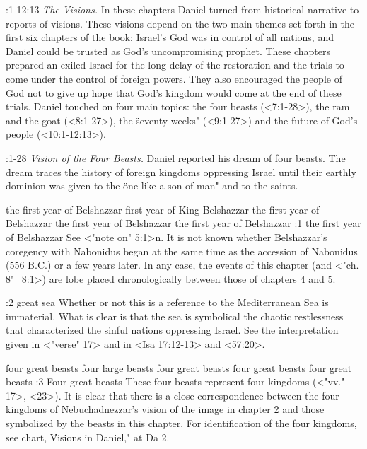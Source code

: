 :1-12:13 {} {\it The Visions.\/} In these chapters Daniel turned from
historical narrative to reports of visions. These visions depend on the two main themes set forth
in the first six chapters of the book: Israel's God was in control of all nations, and Daniel could
be trusted as God's uncompromising prophet. These chapters prepared an exiled Israel for the long
delay of the restoration and the trials to come under the control of foreign powers. They also
encouraged the people of God not to give up hope that God's kingdom would come at the end of these
trials. Daniel touched on four main topics: the four beasts (<7:1-28>), the ram and the goat (<8:1-27>),
the \"seventy weeks" (<9:1-27>) and the future of God's people (<10:1-12:13>).


:1-28 {} {\it Vision of the Four Beasts.\/} Daniel reported his dream of four beasts. The dream traces
the history of foreign kingdoms oppressing Israel until their earthly dominion was given to the \"one
like a son of man" and to the saints.

    {the first year of Belshazzar} %
    {first year of King Belshazzar} %
    {the first year of Belshazzar} %
    {the first year of Belshazzar} %
    {the first year of Belshazzar} %
:1 {the first year of Belshazzar} See <"note on" 5:1>n. It is not known whether
Belshazzar's coregency with Nabonidus began at the same time as the accession of Nabonidus (556
B.C.) or a few years later. In any case, the events of this chapter (and <"ch. 8"_8:1>) are lobe placed
chronologically between those of chapters 4 and 5.

:2 {great sea} Whether or not this is a reference
to the Mediterranean Sea is immaterial. What is clear is that the sea is symbolical the chaotic
restlessness that characterized the sinful nations oppressing Israel. See the interpretation given
in <"verse" 17> and in <Isa 17:12-13> and <57:20>.

    {four great beasts} %
    {four large beasts} %
    {four great beasts} %
    {four great beasts} %
    {four great beasts} %
:3 {Four great beasts} These four beasts represent
four kingdoms (<"vv." 17>, <23>). It is clear that there is a close correspondence between the four
kingdoms of Nebuchadnezzar's vision of the image in chapter 2 and those symbolized by the beasts in
this chapter. For identification of the four kingdoms, see chart, \"Visions in Daniel," at Da 2.

